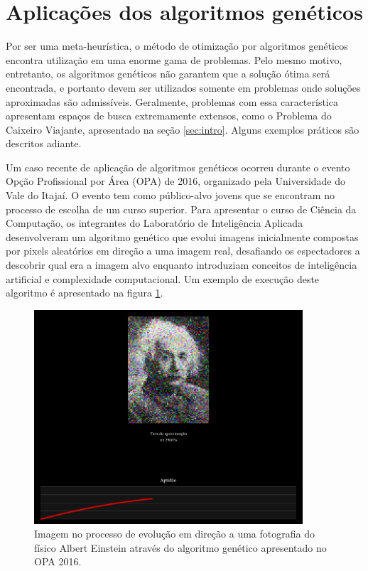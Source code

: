 \documentclass[12pt]{article}
\begin{document}
\section{Aplicações dos algoritmos genéticos} \label{sec:applications}

Por ser uma meta-heurística, o método de otimização por algoritmos genéticos encontra utilização em uma enorme gama de problemas. Pelo mesmo motivo, entretanto, os algoritmos genéticos não garantem que a solução ótima será encontrada, e portanto devem ser utilizados somente em problemas onde soluções aproximadas são admissíveis. Geralmente, problemas com essa característica apresentam espaços de busca extremamente extensos, como o Problema do Caixeiro Viajante, apresentado na seção \ref{sec:intro}. Alguns exemplos práticos são descritos adiante.

Um caso recente de aplicação de algoritmos genéticos ocorreu durante o evento Opção Profissional por Área (OPA) de 2016, organizado pela Universidade do Vale do Itajaí. O evento tem como público-alvo jovens que se encontram no processo de escolha de um curso superior. Para apresentar o curso de Ciência da Computação, os integrantes do Laboratório de Inteligência Aplicada desenvolveram um algoritmo genético que evolui imagens inicialmente compostas por pixels aleatórios em direção a uma imagem real, desafiando os espectadores a descobrir qual era a imagem alvo enquanto introduziam conceitos de inteligência artificial e complexidade computacional. Um exemplo de execução deste algoritmo é apresentado na figura \ref{fig:imageevolution}.

\begin{figure}[h]
    \centering
    \includegraphics[width=10cm]{einstein.png}
    \caption{Imagem no processo de evolução em direção a uma fotografia do físico Albert Einstein através do algoritmo genético apresentado no OPA 2016.}
    \label{fig:imageevolution}
\end{figure}
\end{document}

